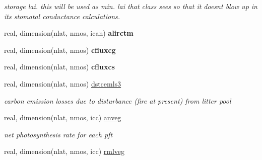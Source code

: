 \begin{DoxyCompactItemize}
\begin{DoxyCompactList}\small\item\em storage lai. this will be used as min. lai that class sees so that it doesn\textquotesingle{}t blow up in its stomatal conductance calculations. \end{DoxyCompactList}\item 
\hypertarget{structctem__statevars_1_1veg__rot_a646c8951d904a9c16dae50515625fdc1}{}real, dimension(nlat, nmos, ican) {\bfseries alirctm}\label{structctem__statevars_1_1veg__rot_a646c8951d904a9c16dae50515625fdc1}

\item 
\hypertarget{structctem__statevars_1_1veg__rot_a4c01f2ab1fdf24fd8522b5a04f1cee5e}{}real, dimension(nlat, nmos) {\bfseries cfluxcg}\label{structctem__statevars_1_1veg__rot_a4c01f2ab1fdf24fd8522b5a04f1cee5e}

\item 
\hypertarget{structctem__statevars_1_1veg__rot_a9cc0042147ffb86affb6e4db19011e6f}{}real, dimension(nlat, nmos) {\bfseries cfluxcs}\label{structctem__statevars_1_1veg__rot_a9cc0042147ffb86affb6e4db19011e6f}

\item 
\hypertarget{structctem__statevars_1_1veg__rot_ad7c664082cbe10d3ae5410aa87dbbdf7}{}real, dimension(nlat, nmos) \hyperlink{structctem__statevars_1_1veg__rot_ad7c664082cbe10d3ae5410aa87dbbdf7}{dstcemls3}\label{structctem__statevars_1_1veg__rot_ad7c664082cbe10d3ae5410aa87dbbdf7}

\begin{DoxyCompactList}\small\item\em carbon emission losses due to disturbance (fire at present) from litter pool \end{DoxyCompactList}\item 
\hypertarget{structctem__statevars_1_1veg__rot_a7549ae73e78430706729db3e80b13142}{}real, dimension(nlat, nmos, icc) \hyperlink{structctem__statevars_1_1veg__rot_a7549ae73e78430706729db3e80b13142}{anveg}\label{structctem__statevars_1_1veg__rot_a7549ae73e78430706729db3e80b13142}

\begin{DoxyCompactList}\small\item\em net photosynthesis rate for each pft \end{DoxyCompactList}\item 
\hypertarget{structctem__statevars_1_1veg__rot_ad9aec62ab0c237b063115c945a974484}{}real, dimension(nlat, nmos, icc) \hyperlink{structctem__statevars_1_1veg__rot_ad9aec62ab0c237b063115c945a974484}{rmlveg}\label{structctem__statevars_1_1veg__rot_ad9aec62ab0c237b063115c945a974484}


\end{DoxyCompactItemize}
